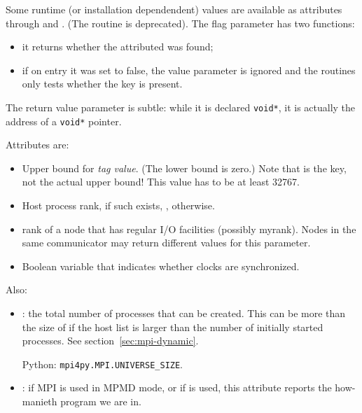 Some runtime (or installation dependendent) values are available as
attributes through
 and
.
(The  routine  is deprecated).
The flag parameter has two functions:
\begin{itemize}
\item it returns whether the attributed was found;
\item if on entry it was set to false, the value parameter is ignored
  and the routines only tests whether the key is present.
\end{itemize}
The return value parameter is subtle: while it is declared \lstinline{void*},
it is actually the address of a \lstinline{void*} pointer.


Attributes are:
\begin{itemize}
\item {}
  Upper bound for \emph{tag value}.
  (The lower bound is zero.)
  Note that  is the key, not the actual upper bound!
  This value has to be at least 32767.
\item {}
  Host process rank, if such exists, , otherwise.
\item {}
rank of a node that has regular I/O facilities (possibly
myrank). Nodes in the same communicator may return different values
for this parameter.
\item {}
Boolean variable that indicates whether clocks are synchronized.
\end{itemize}

Also:
\begin{itemize}
\item {}: the total number of processes
  that can be created. This can be more than the size of
   if the host list is larger than the number of
  initially started processes. See section~\ref{sec:mpi-dynamic}.

  Python: \lstinline{mpi4py.MPI.UNIVERSE_SIZE}.
\item {}: if MPI is used in \ac{MPMD} mode, or
  if  is used, this attribute
  reports the how-manieth program we are in.
\end{itemize}

